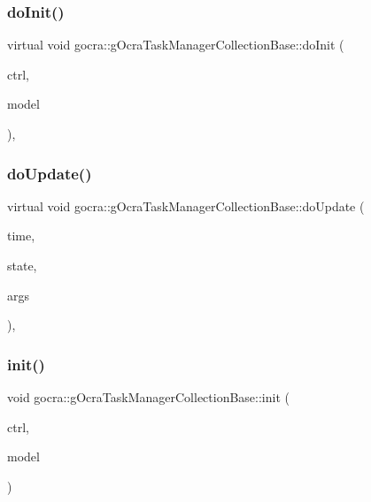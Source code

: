 \subsubsection{\texorpdfstring{do\+Init()}{doInit()}}
{\footnotesize\ttfamily virtual void gocra\+::g\+Ocra\+Task\+Manager\+Collection\+Base\+::do\+Init (\begin{DoxyParamCaption}\item[{\hyperlink{classgocra_1_1GHCJTController}{gocra\+::\+G\+H\+C\+J\+T\+Controller} \&}]{ctrl,  }\item[{\hyperlink{classocra_1_1Model}{ocra\+::\+Model} \&}]{model }\end{DoxyParamCaption})\hspace{0.3cm}{\ttfamily [protected]}, {}}

\hypertarget{classgocra_1_1gOcraTaskManagerCollectionBase_a42f29543b66d4ff1e297225e0f5c6501}{}\label{classgocra_1_1gOcraTaskManagerCollectionBase_a42f29543b66d4ff1e297225e0f5c6501} 
\subsubsection{\texorpdfstring{do\+Update()}{doUpdate()}}
{\footnotesize\ttfamily virtual void gocra\+::g\+Ocra\+Task\+Manager\+Collection\+Base\+::do\+Update (\begin{DoxyParamCaption}\item[{double}]{time,  }\item[{\hyperlink{classocra_1_1Model}{ocra\+::\+Model} \&}]{state,  }\item[{void $\ast$$\ast$}]{args }\end{DoxyParamCaption})\hspace{0.3cm}{\ttfamily [protected]}, {}}

\hypertarget{classgocra_1_1gOcraTaskManagerCollectionBase_ae962f18a286bc706ee867eede15822b6}{}\label{classgocra_1_1gOcraTaskManagerCollectionBase_ae962f18a286bc706ee867eede15822b6} 
\subsubsection{\texorpdfstring{init()}{init()}}
{\footnotesize\ttfamily void gocra\+::g\+Ocra\+Task\+Manager\+Collection\+Base\+::init (\begin{DoxyParamCaption}\item[{\hyperlink{classgocra_1_1GHCJTController}{gocra\+::\+G\+H\+C\+J\+T\+Controller} \&}]{ctrl,  }\item[{\hyperlink{classocra_1_1Model}{ocra\+::\+Model} \&}]{model }\end{DoxyParamCaption})}



